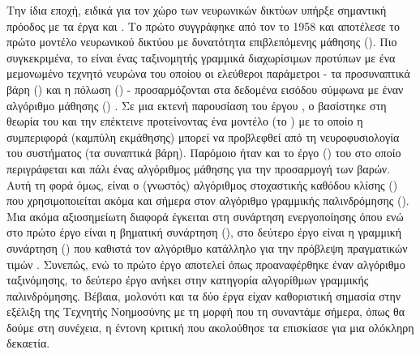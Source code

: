 Την ίδια εποχή, ειδικά για τον χώρο των νευρωνικών δικτύων υπήρξε σημαντική πρόοδος με τα έργα  και . Το πρώτο συγγράφηκε από τον  το 1958 και αποτέλεσε το πρώτο μοντέλο νευρωνικού δικτύου με δυνατότητα επιβλεπόμενης μάθησης (). Πιο συγκεκριμένα, το  είναι ένας ταξινομητής γραμμικά διαχωρίσιμων προτύπων με ένα μεμονωμένο τεχνητό νευρώνα του οποίου οι ελεύθεροι παράμετροι - τα προσυναπτικά βάρη () και η πόλωση () - προσαρμόζονται στα δεδομένα εισόδου σύμφωνα με έναν αλγόριθμο μάθησης () \cite{haykin2009neural}. Σε μια εκτενή παρουσίαση του έργου \cite{rosenblatt1958perceptron}, ο  βασίστηκε στη θεωρία του  και την επέκτεινε προτείνοντας ένα μοντέλο (το ) με το οποίο η συμπεριφορά (καμπύλη εκμάθησης) μπορεί να προβλεφθεί από τη νευροφυσιολογία του συστήματος (τα συναπτικά βάρη). Παρόμοιο ήταν και το έργο  () του  στο οποίο περιγράφεται και πάλι ένας αλγόριθμος μάθησης για την προσαρμογή των βαρών. Αυτή τη φορά όμως, είναι ο (γνωστός) αλγόριθμος στοχαστικής καθόδου κλίσης () που χρησιμοποιείται ακόμα και σήμερα στον αλγόριθμο γραμμικής παλινδρόμησης (). Μια ακόμα αξιοσημείωτη διαφορά έγκειται στη συνάρτηση ενεργοποίησης όπου ενώ στο πρώτο έργο είναι η βηματική συνάρτηση (), στο δεύτερο έργο είναι η γραμμική συνάρτηση () που καθιστά τον αλγόριθμο κατάλληλο για την πρόβλεψη πραγματικών τιμών \cite{goodfellow2016deep, vinhas_2021}. Συνεπώς, ενώ το πρώτο έργο αποτελεί όπως προαναφέρθηκε έναν αλγόριθμο ταξινόμησης, το δεύτερο έργο ανήκει στην κατηγορία αλγορίθμων γραμμικής παλινδρόμησης. Βέβαια, μολονότι και τα δύο έργα είχαν καθοριστική σημασία στην εξέλιξη της Τεχνητής Νοημοσύνης με τη μορφή που τη συναντάμε σήμερα, όπως θα δούμε στη συνέχεια, η έντονη κριτική που ακολούθησε τα επισκίασε για μια ολόκληρη δεκαετία.
\par

